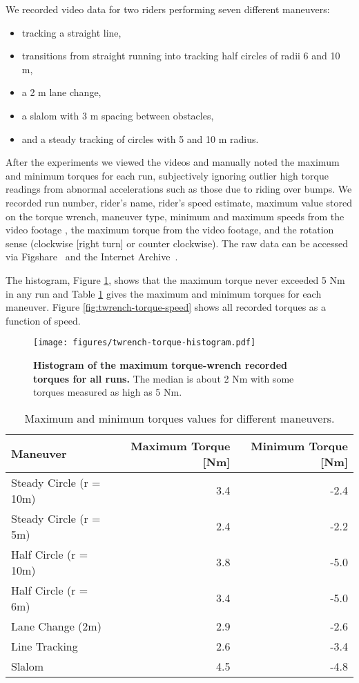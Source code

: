 \documentclass[10pt]{article}
\begin{document}
We recorded video data for two riders performing seven different maneuvers:

\begin{itemize}
  \item tracking a straight line,
  \item transitions from straight running into tracking half circles of radii 6 and 10
    m,
  \item a 2 m lane change,
  \item a slalom with 3 m spacing between obstacles,
  \item and a steady tracking of circles with 5 and 10 m radius.
\end{itemize}

After the experiments we viewed the videos and manually noted the maximum and
minimum torques for each run, subjectively ignoring outlier high torque
readings from abnormal accelerations such as those due to riding over bumps. We
recorded run number, rider's name, rider's speed estimate, maximum value stored
on the torque wrench, maneuver type, minimum and maximum speeds from the video
footage , the maximum torque from the video footage, and the rotation sense
(clockwise [right turn] or counter clockwise). The raw data can be accessed via
Figshare~\cite{} and the Internet Archive~\cite{}.

The histogram, Figure \ref{fig:twrench-torque-histogram}, shows that the
maximum torque never exceeded 5 Nm in any run and Table
\ref{tab:maneuver-torque-values} gives the maximum and minimum torques for each
maneuver. Figure \ref{fig:twrench-torque-speed} shows all recorded torques as a
function of speed.

\begin{figure}
  \centering
  \texttt{[image: figures/twrench-torque-histogram.pdf]}
  \caption{{\bf Histogram of the maximum torque-wrench recorded torques for all runs.}
    The median is about 2 Nm with some torques measured as high as 5 Nm. }
  \label{fig:twrench-torque-histogram}
\end{figure}

\begin{table}
  \caption{Maximum and minimum torques values for different maneuvers.}
  \begin{tabular}{lrr}
    \toprule
    Maneuver & Maximum Torque [Nm] & Minimum Torque [Nm] \\
    \midrule
    Steady Circle (r = 10m) & 3.4 & -2.4 \\
    Steady Circle (r = 5m) & 2.4 & -2.2 \\
    Half Circle (r = 10m) & 3.8 & -5.0 \\
    Half Circle (r = 6m) & 3.4 & -5.0 \\
    Lane Change (2m) & 2.9 & -2.6 \\
    Line Tracking & 2.6 & -3.4 \\
    Slalom & 4.5 & -4.8 \\
    \bottomrule
  \end{tabular}
  \label{tab:maneuver-torque-values}
\end{table}
\end{document}
